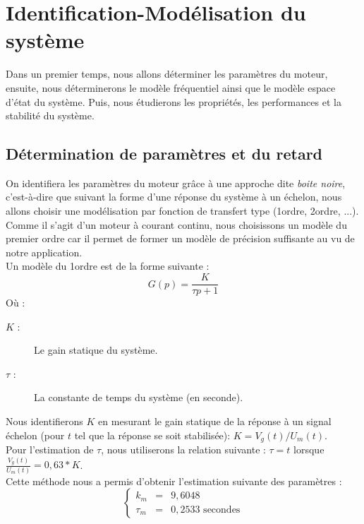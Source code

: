 \chapter{Identification-Modélisation du système}
Dans un premier temps, nous allons déterminer les paramètres du moteur, ensuite, nous déterminerons le modèle fréquentiel ainsi que le modèle espace d'état du système. Puis, nous étudierons les propriétés, les performances et la stabilité du système. 
	\section{Détermination de paramètres et du retard}
	On identifiera les paramètres du moteur grâce à une approche dite \emph{boite noire}, c'est-à-dire que suivant la forme d'une réponse du système à un échelon, nous allons choisir une modélisation par fonction de transfert type (1\ier ordre, 2\ieme ordre, ...). Comme il s'agit d'un moteur à courant continu, nous choisissons un modèle du premier ordre car il permet de former un modèle de précision suffisante au vu de notre application.\\
Un modèle du 1\ier ordre est de la forme suivante :
\begin{equation}
G(p) = \frac{K}{\tau p+1}
\end{equation}
Où : 
\begin{description}
\item[$K$ :] Le gain statique du système.
\item[$\tau$ :] La constante de temps du système (en seconde).
\end{description}

\noindent Nous identifierons $K$ en mesurant le gain statique  de la réponse à un signal échelon (pour $t$ tel que la réponse se soit stabilisée): $ K = V_g(t)/U_m(t)$.\\
\noindent Pour l'estimation de $\tau$, nous utiliserons la relation suivante : $ \tau = t$ lorsque $\frac{V_g(t)}{U_m(t)} = 0,63*K $.\\

Cette méthode nous a permis d'obtenir l'estimation suivante des paramètres : 
\begin{equation}
\left\lbrace
\begin{array}{lll}
k_m &=&  9,6048\\
\tau_m &=& 0,2533 \text{ secondes}
\end{array}\right.
\end{equation}


